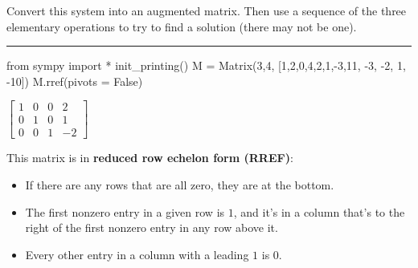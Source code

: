 \documentclass[
  letterpaper,
  DIV=11,
  numbers=noendperiod]{scrartcl}
\newenvironment{Shaded}{\begin{snugshade}}{\end{snugshade}}
\newcommand{\DecValTok}[1]{\textcolor[rgb]{0.68,0.00,0.00}{#1}}
\newcommand{\ImportTok}[1]{\textcolor[rgb]{0.00,0.46,0.62}{#1}}
\newcommand{\NormalTok}[1]{\textcolor[rgb]{0.00,0.23,0.31}{#1}}
\newcommand{\OperatorTok}[1]{\textcolor[rgb]{0.37,0.37,0.37}{#1}}
\newcommand{\VariableTok}[1]{\textcolor[rgb]{0.07,0.07,0.07}{#1}}
\providecommand{\tightlist}{%
  \setlength{\itemsep}{0pt}\setlength{\parskip}{0pt}}\usepackage{longtable,booktabs,array}
\begin{document}
\begin{tcolorbox}[enhanced jigsaw, colbacktitle=quarto-callout-important-color!10!white, left=2mm, bottomrule=.15mm, toprule=.15mm, coltitle=black, opacityback=0, colframe=quarto-callout-important-color-frame, colback=white, arc=.35mm, toptitle=1mm, titlerule=0mm, rightrule=.15mm, leftrule=.75mm, breakable, bottomtitle=1mm, title=\textcolor{quarto-callout-important-color}{\faExclamation}\hspace{0.5em}{Activity}, opacitybacktitle=0.6]

Convert this system into an augmented matrix. Then use a sequence of the
three elementary operations to try to find a solution (there may not be
one).

\end{tcolorbox}

\begin{center}\rule{0.5\linewidth}{0.5pt}\end{center}

\begin{Shaded}
\begin{Highlighting}[]
\ImportTok{from}\NormalTok{ sympy }\ImportTok{import} \OperatorTok{*} 
\NormalTok{init\_printing()}
\NormalTok{M }\OperatorTok{=}\NormalTok{ Matrix(}\DecValTok{3}\NormalTok{,}\DecValTok{4}\NormalTok{, [}\DecValTok{1}\NormalTok{,}\DecValTok{2}\NormalTok{,}\DecValTok{0}\NormalTok{,}\DecValTok{4}\NormalTok{,}\DecValTok{2}\NormalTok{,}\DecValTok{1}\NormalTok{,}\OperatorTok{{-}}\DecValTok{3}\NormalTok{,}\DecValTok{11}\NormalTok{, }\OperatorTok{{-}}\DecValTok{3}\NormalTok{, }\OperatorTok{{-}}\DecValTok{2}\NormalTok{, }\DecValTok{1}\NormalTok{, }\OperatorTok{{-}}\DecValTok{10}\NormalTok{])}
\NormalTok{M.rref(pivots }\OperatorTok{=} \VariableTok{False}\NormalTok{)}
\end{Highlighting}
\end{Shaded}

$\displaystyle \left[\begin{matrix}1 & 0 & 0 & 2\\0 & 1 & 0 & 1\\0 & 0 & 1 & -2\end{matrix}\right]$

This matrix is in \textbf{reduced row echelon form (RREF)}:

\begin{itemize}
\tightlist
\item
  If there are any rows that are all zero, they are at the bottom.
\item
  The first nonzero entry in a given row is \(1\), and it's in a column
  that's to the right of the first nonzero entry in any row above it.
\item
  Every other entry in a column with a leading \(1\) is \(0\).
\end{itemize}
\end{document}
